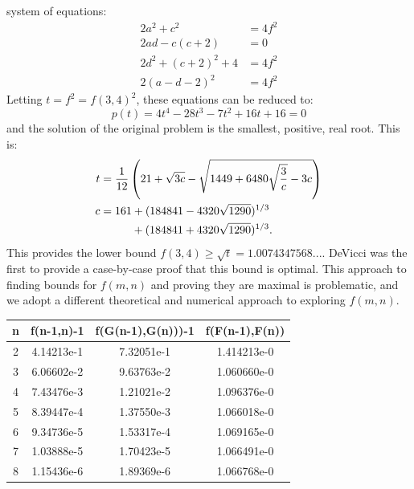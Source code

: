 \documentclass[superscriptaddress,reprint,amsmath,amssymb,aps]{revtex4-1}
\begin{document}
system of equations:
\begin{align*}
2a^2       + c^2         &= 4 f^2 \\
2ad        - c(c+2)      &= 0                \\
2d^2       + (c+2)^2 + 4 &= 4 f^2 \\
2(a-d-2)^2               &= 4 f^2 
\end{align*}
Letting $t = f^2 = f(3,4)^2$, these equations can be reduced to:
\begin{equation*}
p(t) = 4 t^4 - 28 t^3 - 7 t^2 + 16 t + 16 = 0
\end{equation*}
and the solution of the original problem is the smallest, positive, real root.
This is:
\begin{align*}
t &= \frac{1}{12}\left
     (21 + \sqrt{3c} - \sqrt{1449 + 6480\sqrt{\frac{3}{c}} - 3c}\right) \\
c &= 161             + (184841 - 4320\sqrt{1290})^{1/3} \\
  &  \hspace{0.39in} + (184841 + 4320\sqrt{1290})^{1/3}.
\end{align*}
This provides the lower bound $f(3,4) \ge  \sqrt{t} = 1.0074347568...$. DeVicci was the first to provide a case-by-case proof\cite{devicci-shultz} that this bound is optimal. This approach to finding bounds for
$f(m,n)$ and proving they are maximal is problematic, and we adopt a different theoretical and numerical approach to exploring $f(m,n)$.

\begin{center}
\begin{tabular}{| c | c | c | c |}
\hline
n & f(n-1,n)-1 & f(G(n-1),G(n)))-1 & f(F(n-1),F(n)) \\
\hline
2 & 4.14213e-1 & 7.32051e-1        & 1.414213e-0    \\
\hline
3 & 6.06602e-2 & 9.63763e-2        & 1.060660e-0    \\
\hline
4 & 7.43476e-3 & 1.21021e-2        & 1.096376e-0    \\
\hline
5 & 8.39447e-4 & 1.37550e-3        & 1.066018e-0    \\
\hline
6 & 9.34736e-5 & 1.53317e-4        & 1.069165e-0    \\
\hline
7 & 1.03888e-5 & 1.70423e-5        & 1.066491e-0    \\
\hline
8 & 1.15436e-6 & 1.89369e-6        & 1.066768e-0    \\
\hline
\end{tabular}
\end{center}
\end{document}
